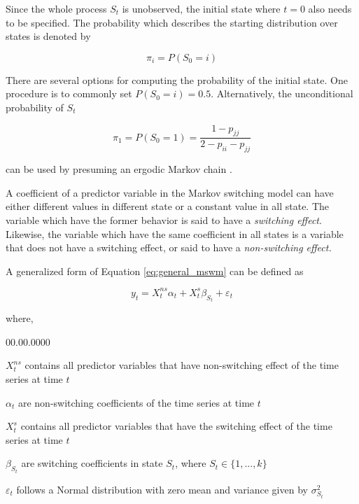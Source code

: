 Since the whole process $S_{t}$ is unobserved, the initial state
where $t=0$ also needs to be specified. The probability which describes
the starting distribution over states is denoted by

\[
\pi_{i}=P(S_{0}=i)
\]

There are several options for computing the probability of the initial
state. One procedure is to commonly set $P(S_{0}=i)=0.5$. Alternatively,
the unconditional probability of $S_{t}$ 

\[
\pi_{1}=P(S_{0}=1)=\frac{1-p_{jj}}{2-p_{ii}-p_{jj}}
\]

can be used by presuming an ergodic Markov chain \citep{hamilton2005regime}.
\newline

A coefficient of a predictor variable in the Markov switching model
can have either different values in different state or a constant
value in all state. The variable which have the former behavior is
said to have a \emph{switching effect}. Likewise, the variable which
have the same coefficient in all states is a variable that does not
have a switching effect, or said to have a \emph{non-switching effect.}

A generalized form of Equation \ref{eq:general_mswm} can be defined
as \citep{perlin2015ms_regress}

\begin{equation}
y_{t}=X_{t}^{ns}\alpha_{t}+X_{t}^{s}\beta_{S_{t}}+\varepsilon_{t}
\end{equation}

where, 
\begin{labeling}{00.00.0000}
\item [{$X_{t}^{ns}$}] contains all predictor variables that have non-switching
effect of the time series at time $t$
\item [{$\alpha_{t}$}] are non-switching coefficients of the time series
at time $t$
\item [{$X_{t}^{s}$}] contains all predictor variables that have the switching
effect of the time series at time $t$
\item [{$\beta_{S_{t}}$}] are switching coefficients in state $S_{t}$,
where $S_{t}\in\{1,...,k\}$
\item [{$\varepsilon_{t}$}] follows a Normal distribution with zero mean
and variance given by $\sigma_{S_{t}}^{2}$ 
\end{labeling}

